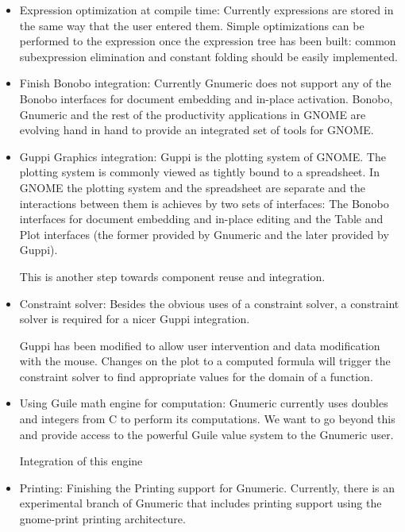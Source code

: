 \documentclass[12pt,twoside,twocolumn]{article}
\begin{document}
\begin{itemize}

	\item {Expression optimization at compile time:} Currently
	expressions are stored in the same way that the user entered
	them.  Simple optimizations can be performed to the expression
	once the expression tree has been built:  common subexpression
	elimination and constant folding should be easily
	implemented.   

	\item {Finish Bonobo integration:} Currently Gnumeric does not
	support any of the Bonobo interfaces for document embedding
	and in-place activation.  Bonobo, Gnumeric and the rest of the
	productivity applications in GNOME are evolving hand in hand
	to provide an integrated set of tools for GNOME. 

	\item {Guppi Graphics integration:} Guppi is the plotting
	system of GNOME.  The plotting system is commonly viewed as
	tightly bound to a spreadsheet.  In GNOME the plotting system
	and the spreadsheet are separate and the interactions between
	them is achieves by two sets of interfaces:  The Bonobo
	interfaces for document embedding and in-place editing and the
	Table and Plot interfaces (the former provided by Gnumeric and
	the later provided by Guppi).  

	This is another step towards component reuse and integration. 

	\item {Constraint solver:} Besides the obvious uses of a
	constraint solver, a constraint solver is required for a nicer
	Guppi integration. 

	Guppi has been modified to allow user intervention and data
	modification with the mouse.  Changes on the plot to a
	computed formula will trigger the constraint solver to find
	appropriate values for the domain of a function. 

	\item {Using Guile math engine for computation:} Gnumeric
	currently uses doubles and integers from C to perform its
	computations.  We want to go beyond this and provide access to
	the powerful Guile value system to the Gnumeric user.  

	Integration of this engine

	\item {Printing:} Finishing the Printing support for Gnumeric.
	Currently, there is an experimental branch of Gnumeric that
	includes printing support using the gnome-print printing
	architecture.

\end{itemize}
\end{document}
